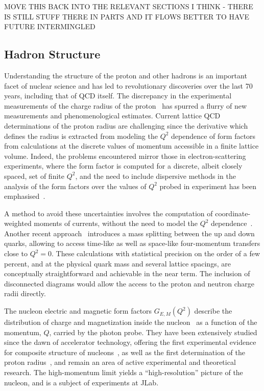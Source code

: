 
{\color{red} MOVE THIS BACK INTO THE RELEVANT SECTIONS I THINK - THERE IS STILL STUFF THERE IN PARTS AND IT FLOWS BETTER TO HAVE FUTURE INTERMINGLED}


\subsection{Hadron Structure}

Understanding the structure of the proton and other hadrons is an important facet of  nuclear science and  has led to revolutionary discoveries over the last 70 years, including that of QCD itself.  
The discrepancy in the experimental measurements of the charge radius of the proton~\cite{Antognini:1900ns} has spurred a flurry of new measurements and phenomenological estimates. Current lattice QCD determinations of the proton radius are challenging since the derivative which defines the radius is extracted from modeling the $Q^2$ dependence of form factors from calculations at the discrete values of momentum accessible in a finite lattice volume.  Indeed, the problems encountered mirror those in electron-scattering experiments, where the form factor is computed for a discrete, albeit closely spaced, set of finite $Q^2$, and the need to include dispersive methods in the analysis of the form factors over the values of $Q^2$ probed in experiment has been emphasised~\cite{Alarcon:2018irp}.

A method to avoid these uncertainties involves the computation of coordinate-weighted moments of currents, without the need to model the $Q^2$ dependence~\cite{Bouchard:2016gmc}. Another recent approach~\cite{Detmold:2018ptb} introduces a mass splitting between the up and down quarks, allowing to access time-like as well as space-like four-momentum transfers close to $Q^2=0$. These calculations with statistical precision on the order of a few percent, and at the physical quark mass and several lattice spacings, are conceptually straightforward and achievable in the near term. The inclusion of disconnected diagrams would allow the access to the proton and neutron charge radii directly.

The nucleon electric and magnetic form factors $G_{E,M}(Q^2)$ describe the distribution of charge and
magnetization inside the
nucleon~\cite{Burkardt:2000za,Burkardt:2002hr,Miller:2007uy,Carlson:2007xd} as a function of the momentum, $Q$, carried by the photon probe.
They have been extensively studied since the dawn of
accelerator technology, offering the first experimental evidence for composite structure 
of nucleons~\cite{Hofstadter:1955ae}, as well as the first
determination of the proton radius~\cite{Chambers:1956zz},
and remain an area of active experimental and theoretical research. The high-momentum limit yields a ``high-resolution'' picture of the nucleon, and is a subject of experiments at JLab.

